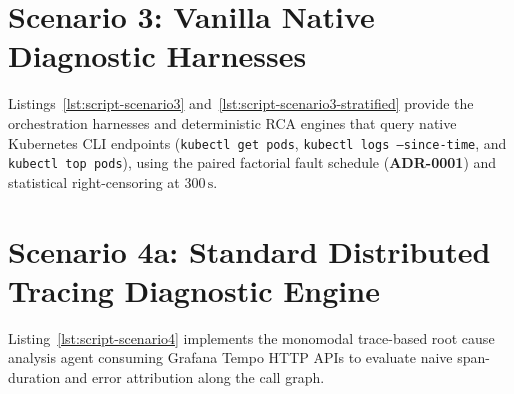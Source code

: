 

\section{Scenario 3: Vanilla Native Diagnostic Harnesses}
\label{sec:app-script-scenario3}

Listings~\ref{lst:script-scenario3} and~\ref{lst:script-scenario3-stratified} provide the orchestration harnesses and deterministic RCA engines that query native Kubernetes CLI endpoints (\texttt{kubectl get pods}, \texttt{kubectl logs --since-time}, and \texttt{kubectl top pods}), using the paired factorial fault schedule (\textbf{ADR-0001}) and statistical right-censoring at $300\,\text{s}$.





\section{Scenario 4a: Standard Distributed Tracing Diagnostic Engine}
\label{sec:app-script-scenario4a}

Listing~\ref{lst:script-scenario4} implements the monomodal trace-based root cause analysis agent consuming Grafana Tempo HTTP APIs to evaluate naive span-duration and error attribution along the call graph.



